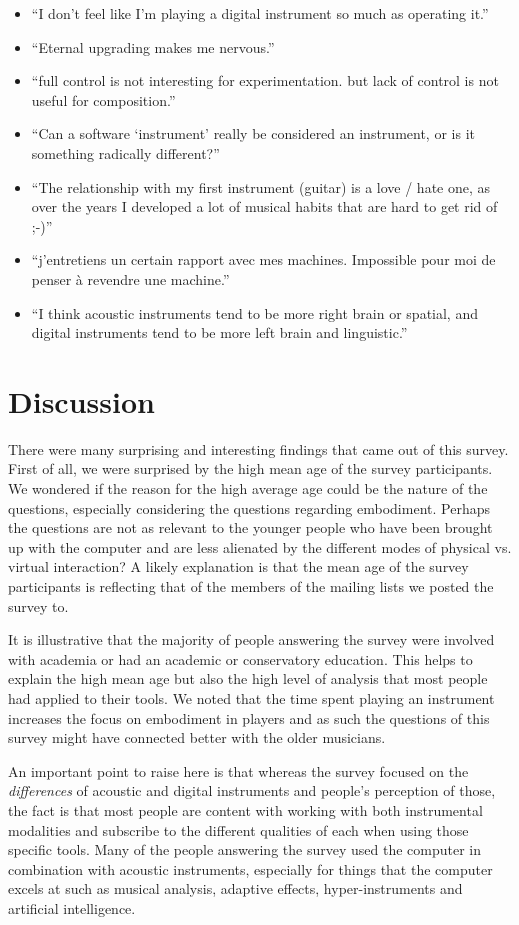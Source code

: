 \begin{itemize}
\item ``I don't feel like I'm playing a digital instrument so much as operating it.''
\item ``Eternal upgrading makes me nervous.''
\item ``full control is not interesting for experimentation. but lack of control is not useful for composition.''
\item ``Can a software `instrument' really be considered an instrument, or is it something radically different?''
\item ``The relationship with my first instrument (guitar) is a love / hate one, as over the years I developed a lot of musical habits that are hard to get rid of ;-)''
\item ``j'entretiens un certain rapport avec mes machines. Impossible pour moi de penser \`{a} revendre une machine.''
\item ``I think acoustic instruments tend to be more right brain or spatial, and digital instruments tend to be more left brain and linguistic.''
\end{itemize}

\section{Discussion}
There were many surprising and interesting findings that came out of this
survey. First of all, we were surprised by the high mean age of the survey
participants. We wondered if the reason for the high average age could be the
nature of the questions, especially considering the questions regarding
embodiment. Perhaps the questions are not as relevant to the younger people who
have been brought up with the computer and are less alienated by the different
modes of physical vs. virtual interaction? A likely explanation is that the mean
age of the survey participants is reflecting that of the members of the mailing
lists we posted the survey to.

It is illustrative that the majority of people answering the survey were
involved with academia or had an academic or conservatory education. This helps
to explain the high mean age but also the high level of analysis that most people
had applied to their tools. We noted that the time spent playing an instrument
increases the focus on embodiment in players and as such the questions of this
survey might have connected better with the older musicians.

An important point to raise here is that whereas the survey focused on the
\textit{differences} of acoustic and digital instruments and people's perception
of those, the fact is that most people are content with working with both
instrumental modalities and subscribe to the different qualities of each when
using those specific tools. Many of the people answering the survey used the
computer in combination with acoustic instruments, especially for things that the
computer excels at such as musical analysis, adaptive effects, hyper-instruments
and artificial intelligence.

